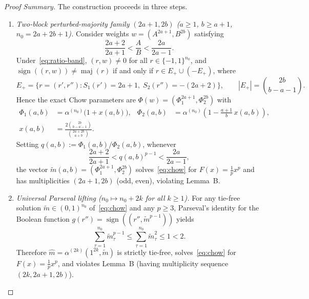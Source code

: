 \documentclass[11pt]{article}
\theoremstyle{definition}
\theoremstyle{remark}
\DeclareMathOperator{\sign}{sign}
\DeclareMathOperator{\maj}{maj}
\begin{document}
\begin{proof}[Proof Summary]
The construction proceeds in three steps.
\begin{enumerate}[leftmargin=2em,itemsep=4pt]
  \item \emph{Two-block perturbed-majority family $(2a+1, 2b)$ ($a \ge 1$, $b \ge a+1$, $n_0 = 2a+2b+1$).}
  Consider weights $w = (A^{2a+1}, B^{2b})$ satisfying
  \begin{equation}\label{eq:ratio-band}
    \frac{2a+2}{2a+1} < \frac{A}{B} < \frac{2a}{2a-1}. \tag{R}
  \end{equation}
  Under~\eqref{eq:ratio-band}, $(r, w) \neq 0$ for all $r \in \{-1,1\}^{n_0}$, and $\sign((r,w)) \neq \maj(r)$ if and only if $r \in E_+ \cup (-E_+)$, where
  \[
    E_+ = \bigl\{r = (r', r'') : S_1(r') = 2a+1,\; S_2(r'') = -(2a+2)\bigr\},
    \qquad |E_+| = \binom{2b}{b-a-1}.
  \]
  Hence the exact Chow parameters are $\Phi(w) = (\Phi_1^{2a+1}, \Phi_2^{2b})$ with
  \begin{align*}
    \Phi_1(a,b) &= \alpha^{(n_0)}\bigl(1 + x(a,b)\bigr),
    & \Phi_2(a,b) &= \alpha^{(n_0)}\!\left(1 - \frac{a+1}{b}\,x(a,b)\right), \\
    x(a,b) &= \frac{2\binom{2b}{b-a-1}}{\binom{2a+2b}{a+b}}.
  \end{align*}
  Setting $q(a,b) := \Phi_1(a,b)/\Phi_2(a,b)$, whenever
  \[
    \frac{2a+2}{2a+1} < q(a,b)^{p-1} < \frac{2a}{2a-1},
  \]
  the vector $\tilde{m}(a,b) = (\Phi_1^{2a+1}, \Phi_2^{2b})$ solves~\eqref{eq:chow} for $F(x) = \frac{1}{p}x^p$ and has multiplicities $(2a+1, 2b)$ (odd, even), violating Lemma~B.

  \item \emph{Universal Parseval lifting ($n_0 \mapsto n_0 + 2k$ for all $k \ge 1$).}
  For any tie-free solution $\tilde{m} \in (0,1)^{n_0}$ of~\eqref{eq:chow} and any $p \ge 3$, Parseval's identity for the Boolean function $g(r'') = \sign((r'', \tilde{m}^{p-1}))$ yields
  \[
    \sum_{\tau=1}^{n_0} \tilde{m}_\tau^{p-1} \le \sum_{\tau=1}^{n_0} \tilde{m}_\tau^2 \le 1 < 2.
  \]
  Therefore $\hat{m} = \alpha^{(2k)}(1^{2k}, \tilde{m})$ is strictly tie-free, solves~\eqref{eq:chow} for $F(x) = \frac{1}{p}x^p$, and violates Lemma~B (having multiplicity sequence $(2k, 2a+1, 2b)$).


\end{enumerate}
\end{proof}
\end{document}
